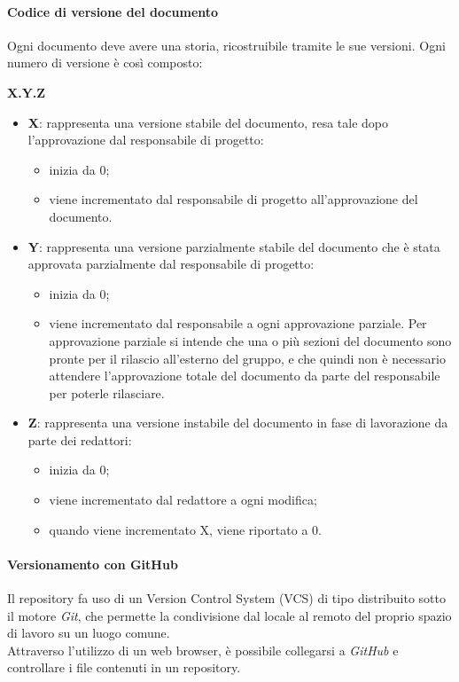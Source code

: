 			\paragraph{Codice di versione del documento}
			Ogni documento deve avere una storia, ricostruibile tramite le sue versioni. Ogni numero di versione è così composto:\\
			\centerline{\textbf{X.Y.Z}}
			\begin{itemize}
			\item \textbf{X}: rappresenta una versione stabile del documento, resa tale dopo l'approvazione dal responsabile di progetto:
				\begin{itemize}
		   			\item inizia da 0;
		   			\item viene incrementato dal responsabile di progetto all'approvazione del documento.
		  		\end{itemize}
		  	\item \textbf{Y}: rappresenta una versione parzialmente stabile del documento che è stata approvata parzialmente dal responsabile di progetto:
		  		\begin{itemize}
		   			\item inizia da 0;
		   			\item viene incrementato dal responsabile a ogni approvazione parziale. Per approvazione parziale si intende che una o più sezioni del documento sono pronte per il rilascio all'esterno del gruppo, e che quindi non è 								necessario attendere l'approvazione totale del documento da parte del responsabile per poterle rilasciare.
		   		\end{itemize}
		   	\item \textbf{Z}: rappresenta una versione instabile del documento in fase di lavorazione da parte dei redattori:
		   		\begin{itemize}
		   			\item inizia da 0;
		   			\item viene incrementato dal redattore a ogni modifica; 
		   			\item quando viene incrementato X, viene riportato a 0.
		   		\end{itemize}
			\end{itemize}
			
			\paragraph{Versionamento con GitHub}
	Il repository fa uso di un Version Control System (VCS) di tipo distribuito sotto il motore \textit{Git}, che permette la condivisione dal locale al remoto del proprio spazio di lavoro su un luogo comune.\\
		Attraverso l'utilizzo di un web browser, è possibile collegarsi a \textit{GitHub} e controllare i file contenuti in un repository. 
